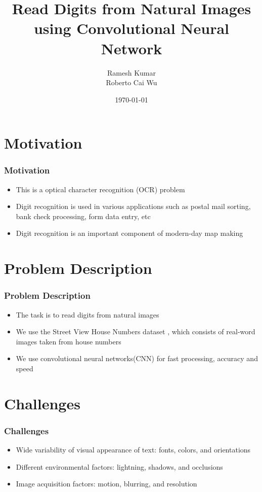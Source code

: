 \documentclass[11.5pt,aspectratio=1610,xcolor={usenames,dvipsnames,table}]{beamer}
\title{Read Digits from Natural Images using Convolutional Neural Network}
\author{Ramesh Kumar \\ Roberto Cai Wu}
\date{\today}
\begin{document}
\begin{frame}
\titlepage
\end{frame}


\section{Motivation}
\begin{frame}
	\frametitle{ Motivation}
	\begin{itemize}
		\item This is a optical character recognition (OCR) problem
		\item Digit recognition is used in various applications such as postal mail
		sorting, bank check processing, form data entry, etc
		\item Digit recognition is an important component of modern-day map making \cite{Goodfellow2013}
	\end{itemize}
\end{frame}

\section{Problem Description}
\begin{frame}
\frametitle{Problem Description}
\begin{itemize}
	\item The task is to read digits from natural images
	\item We use the Street View House Numbers dataset \cite{SVHN}, which consists of real-word images taken from house numbers
	\item We use convolutional neural networks(CNN) for fast processing, accuracy and speed
\end{itemize}

\end{frame}


\section{Challenges}
\begin{frame}
\frametitle{Challenges}
\begin{itemize}
	\item Wide variability of visual appearance of text: fonts, colors, and orientations \cite{Goodfellow2013}
	\item Different environmental factors: lightning, shadows, and occlusions \cite{Goodfellow2013}
	\item Image acquisition factors: motion, blurring, and resolution \cite{Goodfellow2013}
\end{itemize}
\end{frame}
\end{document}
